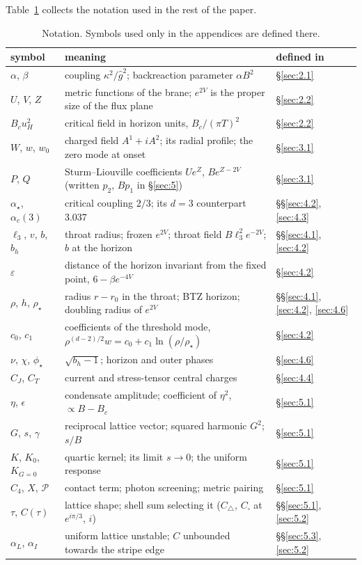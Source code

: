 Table~\ref{tab:notation} collects the notation used in the rest of the
paper.

\begin{table}[t]
\centering
\small
\begin{tabular}{l>{\raggedright\arraybackslash}p{}l}
\toprule
symbol & meaning & defined in \\
\midrule
$\alpha$, $\beta$ & coupling $\kappa^2/\hat g^2$; backreaction parameter $\alpha B^2$ & \S\ref{sec:2.1} \\
$U$, $V$, $Z$ & metric functions of the brane; $e^{2V}$ is the proper size of the flux plane & \S\ref{sec:2.2} \\
$B_c u_H^2$ & critical field in horizon units, $B_c/(\pi T)^2$ & \S\ref{sec:2.2} \\
$W$, $w$, $w_0$ & charged field $A^1 + iA^2$; its radial profile; the zero mode at onset & \S\ref{sec:3.1} \\
$P$, $Q$ & Sturm--Liouville coefficients $Ue^Z$, $Be^{Z-2V}$ (written $p_2$, $Bp_1$ in \S\ref{sec:5}) & \S\ref{sec:3.1} \\
$\alpha_\star$, $\alpha_c(3)$ & critical coupling $2/3$; its $d = 3$ counterpart $3.037$ & \S\S\ref{sec:4.2}, \ref{sec:4.3} \\
$\ell_3$, $v$, $b$, $b_h$ & throat radius; frozen $e^{2V}$; throat field $B\ell_3^2e^{-2V}$; $b$ at the horizon & \S\S\ref{sec:4.1}, \ref{sec:4.2} \\
$\varepsilon$ & distance of the horizon invariant from the fixed point, $6 - \beta e^{-4V}$ & \S\ref{sec:4.2} \\
$\rho$, $h$, $\rho_\star$ & radius $r - r_0$ in the throat; BTZ horizon; doubling radius of $e^{2V}$ & \S\S\ref{sec:4.1}, \ref{sec:4.2}, \ref{sec:4.6} \\
$c_0$, $c_1$ & coefficients of the threshold mode, $\rho^{(d-2)/2}w = c_0 + c_1\ln(\rho/\rho_\star)$ & \S\ref{sec:4.2} \\
$\nu$, $\chi$, $\phi_\star$ & $\sqrt{b_h - 1}$; horizon and outer phases & \S\ref{sec:4.6} \\
$C_J$, $C_T$ & current and stress-tensor central charges & \S\ref{sec:4.4} \\
$\eta$, $\epsilon$ & condensate amplitude; coefficient of $\eta^2$, $\propto B - B_c$ & \S\ref{sec:5.1} \\
$G$, $s$, $\gamma$ & reciprocal lattice vector; squared harmonic $G^2$; $s/B$ & \S\ref{sec:5.1} \\
$K$, $K_0$, $K_{G=0}$ & quartic kernel; its limit $s \to 0$; the uniform response & \S\ref{sec:5.1} \\
$C_4$, $X$, $\mathcal{P}$ & contact term; photon screening; metric pairing & \S\ref{sec:5.1} \\
$\tau$, $C(\tau)$ & lattice shape; shell sum selecting it ($C_\triangle$, $C_\square$ at $e^{i\pi/3}$, $i$) & \S\S\ref{sec:5.1}, \ref{sec:5.2} \\
$\alpha_L$, $\alpha_I$ & uniform lattice unstable; $C$ unbounded towards the stripe edge & \S\S\ref{sec:5.3}, \ref{sec:5.2} \\
\bottomrule
\end{tabular}
\caption{Notation. Symbols used only in the appendices are defined there.}
\label{tab:notation}
\end{table}
